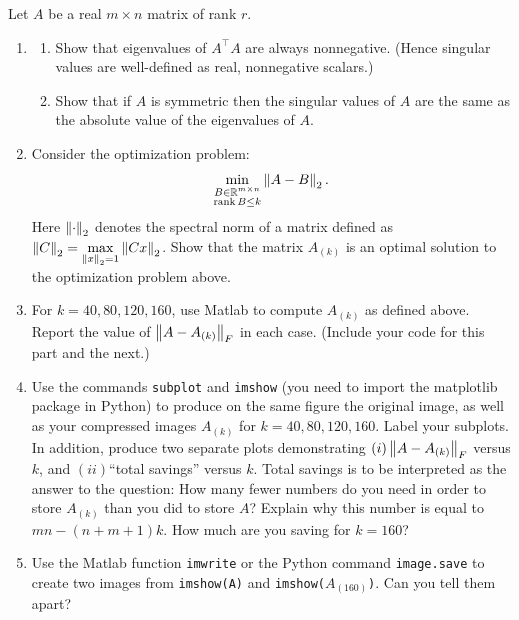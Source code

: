 \pb
Let $A$ be a real $m \times n$ matrix of rank $r$.
\begin{enumerate}[leftmargin=*]
\item 
\begin{enumerate}
\item Show that eigenvalues of $A^\top A$ are always nonnegative. (Hence singular values are well-defined as real, nonnegative scalars.)
\item Show that if $A$ is symmetric then the singular values of $A$ are the same as the absolute value of the eigenvalues of $A$.
\end{enumerate}
\item Consider the optimization problem: $$\min_{\substack{B\in\mathbb{R}^{m\times n}\\ \operatorname{rank} B\leq k} } \left\lVert A-B \right\rVert_{2}.$$
Here $\left\lVert \cdot \right\rVert_{2}$ denotes the spectral norm of a matrix defined as $\displaystyle\left\lVert C \right\rVert_{2} = \max_{\left\lVert x \right\rVert_{2} = 1} \left\lVert Cx \right\rVert_{2}$. Show that the matrix $A_{(k)}$ is an optimal solution to the optimization problem above.
\item For $k = 40, 80, 120, 160$, use Matlab to compute $A_{(k)}$ as defined above. Report the value of $\left\lVert A - A_{(k)} \right\rVert_{F}$ in each case. (Include your code for this part and the next.)
\item Use the commands {\texttt{subplot}} and \texttt{imshow} (you need to import the matplotlib package in Python) to produce on the same figure the original image, as well as your compressed images $A_{(k)}$ for $k = 40,80,120,160$. Label your subplots. In addition, produce two separate plots demonstrating $(i)\left\lVert A-A_{(k)} \right\rVert_{F}$ versus $k$, and $(ii)$``total savings'' versus $k$. Total savings is to be interpreted as the answer to the question: How many fewer numbers do you need in order to store $A_{(k)}$ than you did to store $A$? Explain why this number is equal to $mn-(n+m+1)k$. How much are you saving for $k=160$? 
\item Use the Matlab function \texttt{imwrite} or the Python command \texttt{image.save} to create two images from \texttt{imshow(A)} and \texttt{imshow(}$A_{(160)}$\texttt{)}. Can you tell them apart?
\end{enumerate}

\soln

